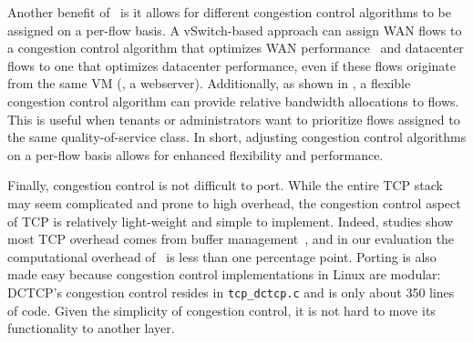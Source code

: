 Another benefit of~\acdc{} is it allows for different congestion control algorithms to be assigned on
a per-flow basis. %
A vSwitch-based approach can assign WAN flows to a congestion control algorithm that optimizes WAN performance~\cite{tan2006compound,flach2013reducing} and
datacenter flows to one that optimizes datacenter performance, even if these flows originate from the same VM (\eg{}, a webserver).
Additionally, as shown in , a flexible congestion control algorithm can provide relative bandwidth allocations to flows.
This is useful when tenants or administrators want to prioritize flows assigned to the same quality-of-service class.
In short, adjusting congestion control algorithms on a per-flow basis allows for 
enhanced flexibility and performance.

Finally, congestion control is not difficult to port. While the entire TCP stack may seem complicated and prone to high overhead,
the congestion control aspect of TCP is relatively light-weight and simple to implement. Indeed, studies
show most TCP overhead comes from buffer management~\cite{optimize-tcp-receive}, and
in our evaluation the computational overhead of~\acdc{} is less than one percentage point.
Porting is also made easy because congestion control implementations in Linux
are modular: DCTCP's congestion control resides in {\tt tcp\_dctcp.c} and is only about 350 lines of code. Given
the simplicity of congestion control, it is not hard to move its functionality to another
layer.



